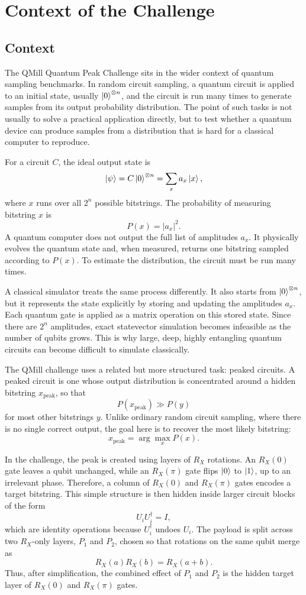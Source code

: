 \section{Context of the Challenge}

\subsection{Context}

The QMill Quantum Peak Challenge sits in the wider context of quantum sampling
benchmarks. In random circuit sampling, a quantum circuit is applied to an
initial state, usually \(\ket{0}^{\otimes n}\), and the circuit is run many
times to generate samples from its output probability distribution. The point of
such tasks is not usually to solve a practical application directly, but to test
whether a quantum device can produce samples from a distribution that is hard
for a classical computer to reproduce.

For a circuit \(C\), the ideal output state is
\[
\ket{\psi} = C\ket{0}^{\otimes n}
= \sum_x a_x \ket{x},
\]
where \(x\) runs over all \(2^n\) possible bitstrings. The probability of
measuring bitstring \(x\) is
\[
P(x) = |a_x|^2.
\]
A quantum computer does not output the full list of amplitudes \(a_x\). It
physically evolves the quantum state and, when measured, returns one bitstring
sampled according to \(P(x)\). To estimate the distribution, the circuit must be
run many times.

A classical simulator treats the same process differently. It also starts from
\(\ket{0}^{\otimes n}\), but it represents the state explicitly by storing and
updating the amplitudes \(a_x\). Each quantum gate is applied as a matrix
operation on this stored state. Since there are \(2^n\) amplitudes, exact
statevector simulation becomes infeasible as the number of qubits grows. This is
why large, deep, highly entangling quantum circuits can become difficult to
simulate classically.

The QMill challenge uses a related but more structured task: peaked circuits.
A peaked circuit is one whose output distribution is concentrated around a
hidden bitstring \(x_\mathrm{peak}\), so that
\[
P(x_\mathrm{peak}) \gg P(y)
\]
for most other bitstrings \(y\). Unlike ordinary random circuit sampling, where
there is no single correct output, the goal here is to recover the most likely
bitstring:
\[
x_\mathrm{peak} = \arg\max_x P(x).
\]

In the challenge, the peak is created using layers of \(R_X\) rotations. An
\(R_X(0)\) gate leaves a qubit unchanged, while an \(R_X(\pi)\) gate flips
\(\ket{0}\) to \(\ket{1}\), up to an irrelevant phase. Therefore, a column of
\(R_X(0)\) and \(R_X(\pi)\) gates encodes a target bitstring. This simple
structure is then hidden inside larger circuit blocks of the form
\[
U_i U_i^\dagger = I,
\]
which are identity operations because \(U_i^\dagger\) undoes \(U_i\). The
payload is split across two \(R_X\)-only layers, \(P_1\) and \(P_2\), chosen so
that rotations on the same qubit merge as
\[
R_X(a)R_X(b)=R_X(a+b).
\]
Thus, after simplification, the combined effect of \(P_1\) and \(P_2\) is the
hidden target layer of \(R_X(0)\) and \(R_X(\pi)\) gates.

